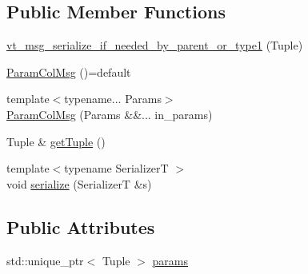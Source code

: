 \subsection*{Public Member Functions}
\begin{DoxyCompactItemize}
\item 
\hyperlink{structvt_1_1vrt_1_1collection_1_1_param_col_msg_3_01_tuple_00_01_col_t_00_01std_1_1enable__if__te13868956e9675e27cec8f332bda9d5e_a70d6345f2e6c9fab0c48b03bc87b3281}{vt\+\_\+msg\+\_\+serialize\+\_\+if\+\_\+needed\+\_\+by\+\_\+parent\+\_\+or\+\_\+type1} (Tuple)
\item 
\hyperlink{structvt_1_1vrt_1_1collection_1_1_param_col_msg_3_01_tuple_00_01_col_t_00_01std_1_1enable__if__te13868956e9675e27cec8f332bda9d5e_a3f158d2bce6804dae653475e383347e8}{Param\+Col\+Msg} ()=default
\item 
{\footnotesize template$<$typename... Params$>$ }\\\hyperlink{structvt_1_1vrt_1_1collection_1_1_param_col_msg_3_01_tuple_00_01_col_t_00_01std_1_1enable__if__te13868956e9675e27cec8f332bda9d5e_a15bec91036eea2d5c80bc439befbfbb7}{Param\+Col\+Msg} (Params \&\&... in\+\_\+params)
\item 
Tuple \& \hyperlink{structvt_1_1vrt_1_1collection_1_1_param_col_msg_3_01_tuple_00_01_col_t_00_01std_1_1enable__if__te13868956e9675e27cec8f332bda9d5e_a69490b583564e6d54199660264f26905}{get\+Tuple} ()
\item 
{\footnotesize template$<$typename SerializerT $>$ }\\void \hyperlink{structvt_1_1vrt_1_1collection_1_1_param_col_msg_3_01_tuple_00_01_col_t_00_01std_1_1enable__if__te13868956e9675e27cec8f332bda9d5e_ad9bdee8e5da604f69a69c09ba016e266}{serialize} (SerializerT \&s)
\end{DoxyCompactItemize}
\subsection*{Public Attributes}
\begin{DoxyCompactItemize}
\item 
std\+::unique\+\_\+ptr$<$ Tuple $>$ \hyperlink{structvt_1_1vrt_1_1collection_1_1_param_col_msg_3_01_tuple_00_01_col_t_00_01std_1_1enable__if__te13868956e9675e27cec8f332bda9d5e_a726c277943c0e2067383c9091c1a7f85}{params}
\end{DoxyCompactItemize}


